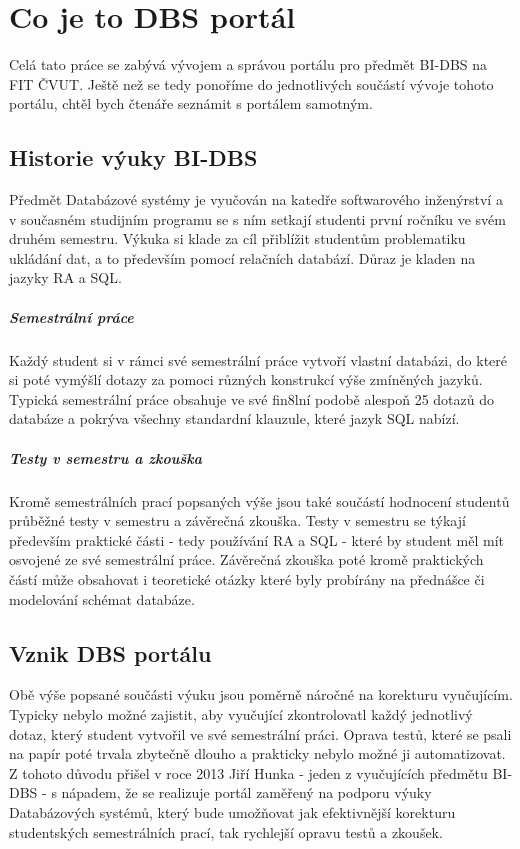 \chapter{Co je to DBS portál} \label{DBSportal}

Celá tato práce se zabývá vývojem a správou portálu pro předmět BI-DBS na FIT ČVUT. Ještě než se tedy ponoříme do jednotlivých součástí vývoje tohoto portálu, chtěl bych čtenáře seznámit s portálem samotným.

\section{Historie výuky BI-DBS}

Předmět Databázové systémy je vyučován na katedře softwarového inženýrství a v současném studijním programu se s ním setkají studenti první ročníku ve svém druhém semestru. Výkuka si klade za cíl přiblížit studentům problematiku ukládání dat, a to především pomocí relačních databází. Důraz je kladen na jazyky RA a SQL.

\paragraph{Semestrální práce}
Každý student si v rámci své semestrální práce vytvoří vlastní databázi, do které si poté vymýšlí dotazy za pomoci různých konstrukcí výše zmíněných jazyků. Typická semestrální práce obsahuje ve své fin8lní podobě alespoň 25 dotazů do databáze a pokrýva všechny standardní klauzule, které jazyk SQL nabízí.

\paragraph{Testy v semestru a zkouška}
Kromě semestrálních prací popsaných výše jsou také součástí hodnocení studentů průběžné testy v semestru a závěrečná zkouška. Testy v semestru se týkají především praktické části - tedy používání RA a SQL - které by student měl mít osvojené ze své semestrální práce. Závěrečná zkouška poté kromě praktických částí může obsahovat i teoretické otázky které byly probírány na přednášce či modelování schémat databáze.

\section{Vznik DBS portálu} \label{DBSportal:creation}
Obě výše popsané součásti výuku jsou poměrně náročné na korekturu vyučujícím. Typicky nebylo možné zajistit, aby vyučující zkontrolovatl každý jednotlivý dotaz, který student vytvořil ve své semestrální práci. Oprava testů, které se psali na papír poté trvala zbytečně dlouho a prakticky nebylo možné ji automatizovat. Z tohoto důvodu přišel v roce 2013 Jiří Hunka - jeden z vyučujících předmětu BI-DBS - s nápadem, že se realizuje portál zaměřený na podporu výuky Databázových systémů, který bude umožňovat jak efektivnější korekturu studentských semestrálních prací, tak rychlejší opravu testů a zkoušek.

